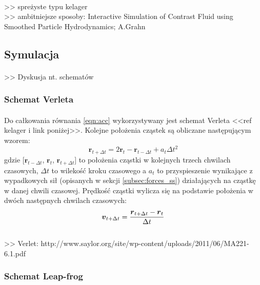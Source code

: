 \paragraph{}
{\noindent\color{red}>> spreżyste typu kelager\\}
{\color{red}>> ambitniejsze sposoby: Interactive Simulation of Contrast Fluid using Smoothed Particle Hydrodynamics; A.Grahn}
\par

\subsection{Symulacja}
\label{subsec:integration_ss}

\paragraph{}
{\color{red}>> Dyskusja nt. schematów}
\par

\subsubsection{Schemat Verleta}
\paragraph{}
Do całkowania równania \eqref{eqn:acc} wykorzystywany jest schemat Verleta <<ref kelager i link poniżej>>. Kolejne położenia cząstek są obliczane następującym wzorem:
\begin{equation}
\boldsymbol{r}_{t+\Delta t} = 2\boldsymbol{r}_t - \boldsymbol{r}_{t-\Delta t} + a_t\Delta t^2
\label{eqn:verlet_pos_int}
\end{equation}
gdzie [$\boldsymbol{r}_{t-\Delta t}$, $\boldsymbol{r}_{t}$, $\boldsymbol{r}_{t+\Delta t}$] to położenia cząstki w kolejnych trzech chwilach czasowych, ${\Delta t}$ to wilekość kroku czasowego a $a_t$ to przyspieszenie wynikające z wypadkowych sił (opisanych w sekcji \eqref{subsec:forces_ss}) działających na cząstkę w danej chwili czasowej. Prędkość cząstki wylicza się na podstawie położenia w dwóch następnych chwilach czasowych:
\begin{equation}
\boldsymbol{v}_{t+\Delta t} = {\boldsymbol{r}_{t+\Delta t} - \boldsymbol{r}_{t} \over \Delta t}
\label{eqn:verlet_vel_int}
\end{equation}
{\color{red}\\>> Verlet: http://www.saylor.org/site/wp-content/uploads/2011/06/MA221-6.1.pdf}
\par

\subsubsection{Schemat Leap-frog}
\paragraph{}

\par

